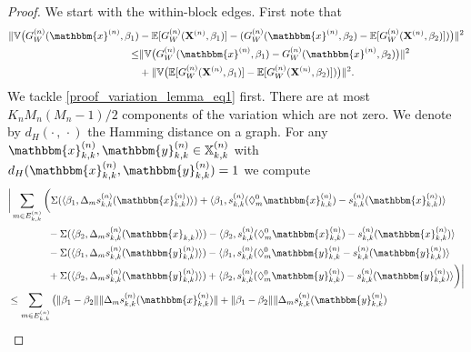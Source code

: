\documentclass{article}
\begin{document}
\begin{proof}
    We start with the within-block edges. First note that
    \begin{align} 
        \Vert \mathbb{V}\big(G_W^{(n)}(\mathbbm{x}^{(n)},\beta_1) &- \mathbb{E}[G_W^{(n)}(\mathbf{X}^{(n)},\beta_1)] - (G_W^{(n)}(\mathbbm{x}^{(n)},\beta_2) - \mathbb{E}[G_W^{(n)}(\mathbf{X}^{(n)},\beta_2)]) \big) \Vert^2
        \nonumber \\
        \leq & \Vert \mathbb{V}\big(G_W^{(n)}(\mathbbm{x}^{(n)},\beta_1) - G_W^{(n)}(\mathbbm{x}^{(n)},\beta_2) \big) \Vert^2 \label{proof_variation_lemma_eq1} \\
        & +  \Vert \mathbb{V}\big( \mathbb{E}[G_W^{(n)}(\mathbf{X}^{(n)},\beta_1)]  - \mathbb{E}[G_W^{(n)}(\mathbf{X}^{(n)},\beta_2)]) \big) \Vert^2.\label{proof_variation_lemma_eq2}
    \end{align}
    We tackle \eqref{proof_variation_lemma_eq1} first. There are at most $K_n M_n(M_n-1)/2$ components of the variation which are not zero. We denote by $d_H(\cdot \, , \, \cdot)$ the Hamming distance on a graph. For any $\mathbbm{x}_{k,k}^{(n)},\mathbbm{y}_{k,k}^{(n)} \in \mathbb{X}_{k,k}^{(n)}$ with $ d_H(\mathbbm{x}_{k,k}^{(n)},\mathbbm{y}_{k,k}^{(n)})=1$ we compute
    \begin{align*}
        & \bigg\vert \sum_{m \in E_{k,k}^{(n)}} \bigg(\Sigma ( \langle \beta_1 , \Delta_m s_{k,k}^{(n)}(\mathbbm{x}_{k,k}^{(n)}) \rangle ) + \langle \beta_1, s_{k,k}^{(n)}(\Diamond_m^0\mathbbm{x}_{k,k}^{(n)}) - s_{k,k}^{(n)}(\mathbbm{x}_{k,k}^{(n)}) \rangle \\
         & \qquad \qquad -  \Sigma ( \langle \beta_2 , \Delta_m s_{k,k}^{(n)}(\mathbbm{x}_{k,k}) \rangle ) - \langle \beta_2, s_{k,k}^{(n)}(\Diamond_m^0\mathbbm{x}_{k,k}^{(n)}) - s_{k,k}^{(n)}(\mathbbm{x}_{k,k}^{(n)}) \rangle \\
         & \qquad \qquad -  \Sigma ( \langle \beta_1 , \Delta_m s_{k,k}^{(n)}(\mathbbm{y}_{k,k}^{(n)}) \rangle ) - \langle \beta_1, s_{k,k}^{(n)}(\Diamond_m^0 \mathbbm{y}_{k,k}^{(n)} - s_{k,k}^{(n)}(\mathbbm{y}_{k,k}^{(n)}) \rangle \\
         & \qquad \qquad + \Sigma ( \langle \beta_2 , \Delta_m s_{k,k}^{(n)}(\mathbbm{y}_{k,k}^{(n)}) \rangle ) + \langle \beta_2, s_{k,k}^{(n)}(\Diamond_m^0\mathbbm{y}_{k,k}^{(n)}) - s_{k,k}^{(n)}(\mathbbm{y}_{k,k}^{(n)}) \rangle  \bigg) \bigg\vert \\ 
         &\leq \sum_{m \in E_{k,k}^{(n)}} \big( \Vert \beta_1 - \beta_2 \Vert \Vert  \Delta_m s_{k,k}^{(n)}(\mathbbm{x}_{k,k}^{(n)}) \Vert +  \Vert \beta_1 - \beta_2 \Vert \Vert  \Delta_m s_{k,k}^{(n)}(\mathbbm{y}_{k,k}^{(n)}) \\

\end{align*}
\end{proof}
\end{document}
